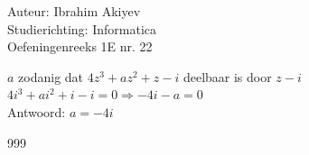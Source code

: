 \documentclass[a4paper]{article}
\begin{document}
\noindent \large Auteur: Ibrahim Akiyev \\
\noindent \large Studierichting: Informatica\\
\noindent \large Oefeningenreeks 1E nr. 22\\

\medskip

\normalsize

$a$ zodanig dat $4z^3+az^2+z-i$ deelbaar is door $z-i$\\

$4i^3+ai^2+i-i = 0 \Rightarrow -4i-a = 0$\\

Antwoord: $a = -4i$

\begin{thebibliography}{999}
\end{thebibliography}
\end{document}
